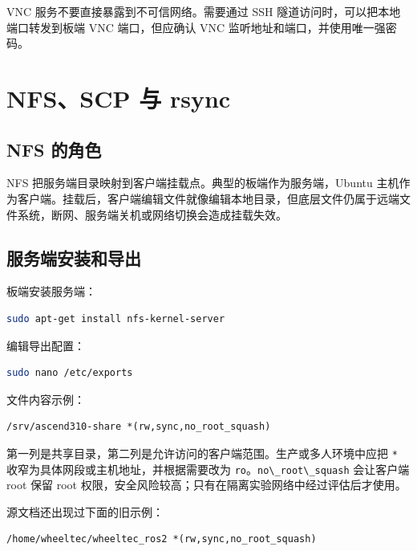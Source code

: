 VNC 服务不要直接暴露到不可信网络。需要通过 SSH
隧道访问时，可以把本地端口转发到板端 VNC 端口，但应确认 VNC
监听地址和端口，并使用唯一强密码。

\section{NFS、SCP 与 rsync}\label{nfsscp-ux4e0e-rsync}

\subsection{NFS 的角色}\label{nfs-ux7684ux89d2ux8272}

NFS 把服务端目录映射到客户端挂载点。典型的板端作为服务端，Ubuntu
主机作为客户端。挂载后，客户端编辑文件就像编辑本地目录，但底层文件仍属于远端文件系统，断网、服务端关机或网络切换会造成挂载失效。

\subsection{服务端安装和导出}\label{ux670dux52a1ux7aefux5b89ux88c5ux548cux5bfcux51fa}

板端安装服务端：

\begin{lstlisting}[language=bash]
sudo apt-get install nfs-kernel-server
\end{lstlisting}

编辑导出配置：

\begin{lstlisting}[language=bash]
sudo nano /etc/exports
\end{lstlisting}

文件内容示例：

\begin{lstlisting}
/srv/ascend310-share *(rw,sync,no_root_squash)
\end{lstlisting}

第一列是共享目录，第二列是允许访问的客户端范围。生产或多人环境中应把
\passthrough{\lstinline!*!} 收窄为具体网段或主机地址，并根据需要改为
\passthrough{\lstinline!ro!}。\passthrough{\lstinline!no\_root\_squash!}
会让客户端 root 保留 root
权限，安全风险较高；只有在隔离实验网络中经过评估后才使用。

源文档还出现过下面的旧示例：

\begin{lstlisting}
/home/wheeltec/wheeltec_ros2 *(rw,sync,no_root_squash)
\end{lstlisting}

